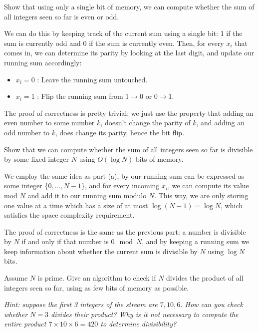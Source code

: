 \documentclass[11pt]{article}
\begin{document}
\begin{subparts}
\subpart Show that using only a single bit of memory, we can compute whether the sum of all integers seen so far is even or odd.

\begin{solution}
	We can do this by keeping track of the current sum using a single bit: 1 if the sum is currently odd 
	and 0 if the sum is currently even. Then, for every \( x_i \) that comes in, we can determine its parity 
	by looking at the last digit, and update our running sum accordingly: 
	\begin{itemize}
		\item \( x_i = 0 \) : Leave the running sum untouched.
		\item \( x_i = 1 \) : Flip the running sum from \( 1 \to 0 \) or \( 0 \to 1 \).
	\end{itemize}
	The proof of correctness is pretty trivial: we just use the property that adding an even number to some 
	number \( k \), doesn't change the parity of \( k \), and adding an odd number to \( k \), does change 
	its parity, hence the bit flip.
\end{solution}

\subpart Show that we can compute whether the sum of all integers seen so far is divisible by some fixed integer $N$ using $O(\log N)$ bits of memory.

\begin{solution}
	We employ the same idea as part (a), by our running sum can be expressed as some integer 
	\( \{0, \dots, N-1\}  \), and for every incoming 
	\( x_i \), we can compute its value mod \( N \) and add it to our running sum modulo \( N \).  
	This way, we are only storing one value at a time which has a size of at most \( \log(N - 1) = \log N \), 
	which satisfies the space complexity requirement.

	The proof of correctness is the same as the previous part: a number is divisible by \( N \) if and only if 
	that number is \( 0 \mod N \), and by keeping a running sum we keep information about whether the current 
	sum is divisible by \( N \) using \( \log N \) bits. 
\end{solution}

\subpart Assume $N$ is prime.
Give an algorithm to check if $N$ divides the product of all integers seen so far, using as few bits of memory as possible.

\emph{Hint: suppose the first 3 integers of the stream are $7, 10, 6$. How can you check whether $N = 3$ divides their product? Why is it not necessary to compute the entire product $7 \times 10 \times 6 = 420$ to determine divisibility?}


\end{subparts}
\end{document}
